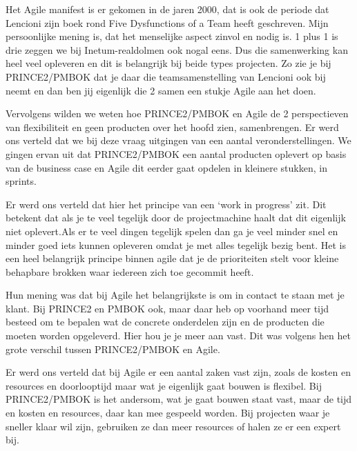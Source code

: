 \documentclass[dutch]{hogent-article}
\begin{document}
Het Agile manifest is er gekomen in de jaren 2000, dat is ook de periode dat Lencioni zijn boek rond Five Dysfunctions of a Team heeft geschreven. Mijn persoonlijke mening is, dat het menselijke aspect zinvol en nodig is. 1 plus 1 is drie zeggen we bij Inetum-realdolmen ook nogal eens. Dus die samenwerking kan heel veel opleveren en dit is belangrijk bij beide types projecten. Zo zie je bij PRINCE2/PMBOK dat je daar die teamsamenstelling van Lencioni ook bij neemt en dan ben jij \linebreak eigenlijk die 2 samen een stukje Agile aan het doen. 
\newline

Vervolgens wilden we weten hoe PRINCE2/PMBOK en Agile de 2 perspectieven van flexibiliteit en geen producten over het hoofd zien, samenbrengen. Er werd ons verteld dat we bij deze vraag uitgingen van een aantal veronderstellingen. We gingen ervan uit dat PRINCE2/PMBOK een aantal producten oplevert op basis van de business case en Agile dit eerder gaat opdelen in kleinere stukken, in sprints. 
\newline

Er werd ons verteld dat hier het principe van een ‘work in progress’ zit. Dit betekent dat als je te veel tegelijk door de projectmachine haalt dat dit eigenlijk niet oplevert.Als er te veel dingen tegelijk spelen dan ga je veel minder snel en minder goed iets kunnen opleveren omdat je met alles tegelijk bezig bent. Het is een heel belangrijk principe binnen agile dat je de prioriteiten stelt voor kleine behapbare brokken waar iedereen zich toe gecommit heeft. 
\newline

Hun mening was dat bij Agile het belangrijkste is om in contact te  staan met je klant. Bij PRINCE2 en PMBOK ook, maar daar heb op voorhand meer tijd besteed om te bepalen wat de concrete onderdelen zijn en de producten die moeten worden opgeleverd. Hier hou je je meer aan vast. Dit was volgens hen het grote verschil tussen PRINCE2/PMBOK en Agile. 
\newline

Er werd ons verteld dat bij Agile er een aantal zaken vast zijn, zoals de kosten en resources en doorlooptijd maar wat je eigenlijk gaat bouwen is flexibel. Bij PRINCE2/PMBOK is het andersom, wat je gaat bouwen staat vast, maar de tijd en kosten en resources, daar kan mee gespeeld worden. Bij projecten waar je sneller klaar wil zijn, gebruiken ze dan meer resources of halen ze er een expert bij.
\newline
\end{document}
